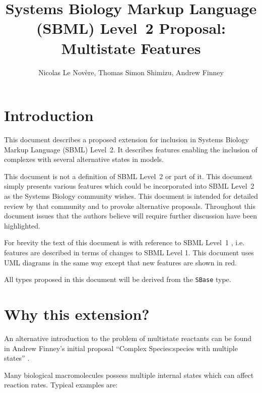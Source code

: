\documentclass{cekarticle}
\title{Systems Biology Markup Language (SBML) Level~2 Proposal: Multistate Features}
\author{Nicolas Le Nov\`{e}re, Thomas Simon Shimizu, Andrew Finney}
\begin{document}

\maketitlepage

\section{Introduction}
\label{sec:introduction}

This document describes a proposed extension for inclusion in Systems Biology
Markup Language (SBML) Level~2. It describes features enabling the inclusion of
complexes with several alternative states in models.

This document is not a definition of SBML Level~2 or part of it.  This document
simply presents various features which could be incorporated into SBML Level~2
as the Systems Biology community wishes.  This document is intended for detailed
review by that community and to provoke alternative proposals.  Throughout this
document issues that the authors believe will require further discussion have
been highlighted.

For brevity the text of this document is with reference to SBML Level~1
\citep{Hucka:2001}, i.e. features are described in terms of changes to SBML
Level 1.  This document uses UML diagrams in the same way except that new
features are shown in red.

All types proposed in this document will be derived from the \texttt{SBase}
type.

\section{Why this extension?}
\label{sec:why}

An alternative introduction to the problem of multistate reactants can be found
in Andrew Finney's initial proposal ``Complex Species:species with multiple
states'' \citep{Finney:2001a}.

Many biological macromolecules possess multiple internal states which can affect
reaction rates.  Typical examples are:
\end{document}
